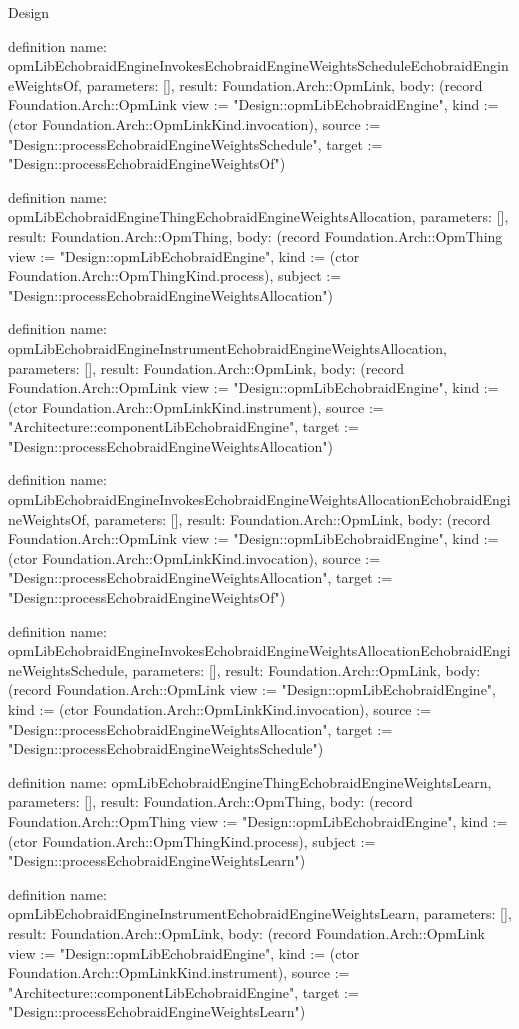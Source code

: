 \begin{lexlean}{Design}
\begin{semanticmodule}
definition{
  name: opmLibEchobraidEngineInvokesEchobraidEngineWeightsScheduleEchobraidEngineWeightsOf,
  parameters: [],
  result: Foundation.Arch::OpmLink,
  body: (record Foundation.Arch::OpmLink {view := "Design::opmLibEchobraidEngine", kind := (ctor Foundation.Arch::OpmLinkKind.invocation), source := "Design::processEchobraidEngineWeightsSchedule", target := "Design::processEchobraidEngineWeightsOf"})
}

definition{
  name: opmLibEchobraidEngineThingEchobraidEngineWeightsAllocation,
  parameters: [],
  result: Foundation.Arch::OpmThing,
  body: (record Foundation.Arch::OpmThing {view := "Design::opmLibEchobraidEngine", kind := (ctor Foundation.Arch::OpmThingKind.process), subject := "Design::processEchobraidEngineWeightsAllocation"})
}

definition{
  name: opmLibEchobraidEngineInstrumentEchobraidEngineWeightsAllocation,
  parameters: [],
  result: Foundation.Arch::OpmLink,
  body: (record Foundation.Arch::OpmLink {view := "Design::opmLibEchobraidEngine", kind := (ctor Foundation.Arch::OpmLinkKind.instrument), source := "Architecture::componentLibEchobraidEngine", target := "Design::processEchobraidEngineWeightsAllocation"})
}

definition{
  name: opmLibEchobraidEngineInvokesEchobraidEngineWeightsAllocationEchobraidEngineWeightsOf,
  parameters: [],
  result: Foundation.Arch::OpmLink,
  body: (record Foundation.Arch::OpmLink {view := "Design::opmLibEchobraidEngine", kind := (ctor Foundation.Arch::OpmLinkKind.invocation), source := "Design::processEchobraidEngineWeightsAllocation", target := "Design::processEchobraidEngineWeightsOf"})
}

definition{
  name: opmLibEchobraidEngineInvokesEchobraidEngineWeightsAllocationEchobraidEngineWeightsSchedule,
  parameters: [],
  result: Foundation.Arch::OpmLink,
  body: (record Foundation.Arch::OpmLink {view := "Design::opmLibEchobraidEngine", kind := (ctor Foundation.Arch::OpmLinkKind.invocation), source := "Design::processEchobraidEngineWeightsAllocation", target := "Design::processEchobraidEngineWeightsSchedule"})
}

definition{
  name: opmLibEchobraidEngineThingEchobraidEngineWeightsLearn,
  parameters: [],
  result: Foundation.Arch::OpmThing,
  body: (record Foundation.Arch::OpmThing {view := "Design::opmLibEchobraidEngine", kind := (ctor Foundation.Arch::OpmThingKind.process), subject := "Design::processEchobraidEngineWeightsLearn"})
}

definition{
  name: opmLibEchobraidEngineInstrumentEchobraidEngineWeightsLearn,
  parameters: [],
  result: Foundation.Arch::OpmLink,
  body: (record Foundation.Arch::OpmLink {view := "Design::opmLibEchobraidEngine", kind := (ctor Foundation.Arch::OpmLinkKind.instrument), source := "Architecture::componentLibEchobraidEngine", target := "Design::processEchobraidEngineWeightsLearn"})
}


\end{semanticmodule}
\end{lexlean}
